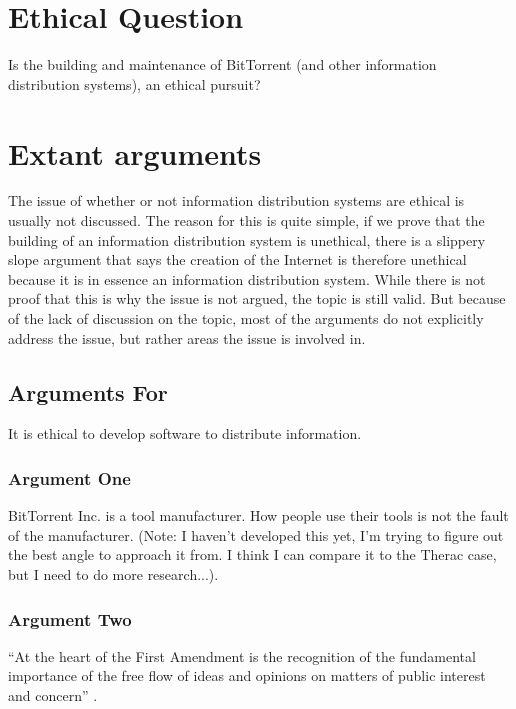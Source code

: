 \documentclass[11pt]{article}
\begin{document}
\section{Ethical Question}

Is the building and maintenance of BitTorrent (and other information distribution systems), an ethical pursuit?

\section{Extant arguments}

The issue of whether or not information distribution systems are ethical is usually not discussed. The reason for this is quite simple, if we prove that the building of an information distribution system is unethical, there is a slippery slope argument that says the creation of the Internet is therefore unethical because it is in essence an information distribution system. While there is not proof that this is why the issue is not argued, the topic is still valid. But because of the lack of discussion on the topic, most of the arguments do not explicitly address the issue, but rather areas the issue is involved in.

\subsection{Arguments For}

It is ethical to develop software to distribute information.

\subsubsection{Argument One}
BitTorrent Inc. is a tool manufacturer. How people use their tools is not the fault of the manufacturer. (Note: I haven't developed this yet, I'm trying to figure out the best angle to approach it from. I think I can compare it to the Therac case, but I need to do more research...).

\subsubsection{Argument Two}
``At the heart of the First Amendment is the recognition of the fundamental importance of the free flow of ideas and opinions on matters of public interest and concern'' \cite[51]{1988hustler}.
\end{document}
